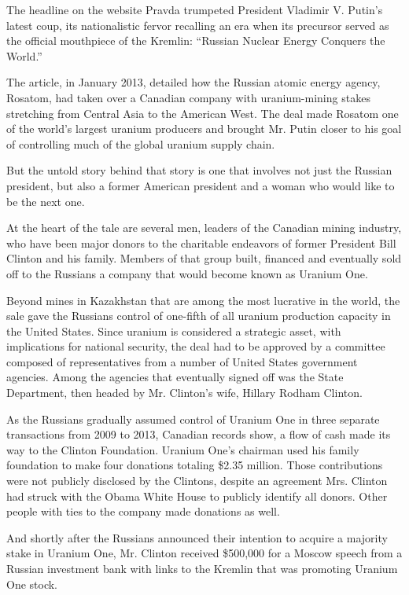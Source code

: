 The headline on the website Pravda trumpeted President Vladimir V.
Putin's latest coup, its nationalistic fervor recalling an era when its
precursor served as the official mouthpiece of the Kremlin: ``Russian
Nuclear Energy Conquers the World.''

The article, in January 2013, detailed how the Russian atomic energy
agency, Rosatom, had taken over a Canadian company with uranium-mining
stakes stretching from Central Asia to the American West. The deal made
Rosatom one of the world's largest uranium producers and brought Mr.
Putin closer to his goal of controlling much of the global uranium
supply chain.

But the untold story behind that story is one that involves not just the
Russian president, but also a former American president and a woman who
would like to be the next one.

At the heart of the tale are several men, leaders of the Canadian mining
industry, who have been major donors to the charitable endeavors of
former President Bill Clinton and his family. Members of that group
built, financed and eventually sold off to the Russians a company that
would become known as Uranium One.

Beyond mines in Kazakhstan that are among the most lucrative in the
world, the sale gave the Russians control of one-fifth of all uranium
production capacity in the United States. Since uranium is considered a
strategic asset, with implications for national security, the deal had
to be approved by a committee composed of representatives from a number
of United States government agencies. Among the agencies that eventually
signed off was the State Department, then headed by Mr. Clinton's wife,
Hillary Rodham Clinton.

As the Russians gradually assumed control of Uranium One in three
separate transactions from 2009 to 2013, Canadian records show, a flow
of cash made its way to the Clinton Foundation. Uranium One's chairman
used his family foundation to make four donations totaling \$2.35
million. Those contributions were not publicly disclosed by the
Clintons, despite an agreement Mrs. Clinton had struck with the Obama
White House to publicly identify all donors. Other people with ties to
the company made donations as well.

And shortly after the Russians announced their intention to acquire a
majority stake in Uranium One, Mr. Clinton received \$500,000 for a
Moscow speech from a Russian investment bank with links to the Kremlin
that was promoting Uranium One stock.


